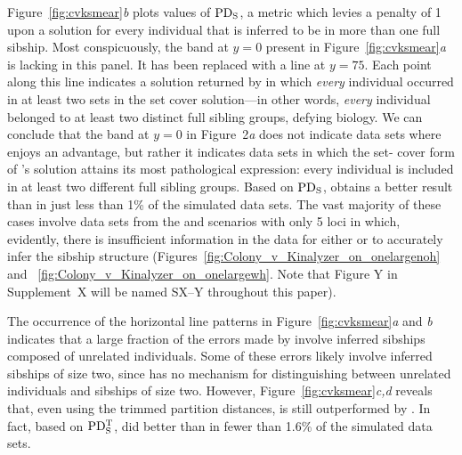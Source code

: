 \documentclass[11pt]{article}
\begin{document}
{Figure~\ref{fig:cvksmear}{\em b} plots values of $\mathrm{PD_S}$, a metric which levies a penalty of 1 upon a 
solution for every individual that is inferred to be in more than one full sibship.  Most 
conspicuously, the band at $y=0$ present in Figure~\ref{fig:cvksmear}{\em a} is lacking in this panel.  
It has been replaced with a line at $y=75$.  Each point along this line indicates a solution returned 
by \kinalyzer{} in which {\em every} individual occurred in at least two sets in the set cover 
solution---in other words, {\em every} individual belonged to at least two distinct full sibling 
groups, defying biology.  We can conclude that the band at $y=0$ in Figure~2{\em a} does not indicate 
data sets where \kinalyzer{} enjoys an advantage, but rather it indicates data sets in which the set-
cover form of \kinalyzer{}'s solution attains its most pathological expression: every individual is 
included in at least two different full sibling groups.  Based on $\mathrm{PD_S}$, \kinalyzer{} obtains a better 
result than \colony{} in just less than 1\% of the simulated data sets.  The vast majority of these 
cases involve data sets from the \onelargenoh{} and \onelargewh{} scenarios with only 5 loci in which, 
evidently, there is insufficient information in the data for either \colony{} or \kinalyzer{} to 
accurately infer the sibship structure (Figures~\ref{fig:Colony_v_Kinalyzer_on_onelargenoh} and~
\ref{fig:Colony_v_Kinalyzer_on_onelargewh}. Note that Figure Y in Supplement~X will be named SX--Y 
throughout this paper).  

The occurrence of the horizontal line patterns in Figure~\ref{fig:cvksmear}{\em a} and {\em b} 
indicates that a large fraction of the errors made by \kinalyzer{} involve inferred sibships composed 
of unrelated individuals.  Some of these errors likely involve inferred sibships of size two, since 
\kinalyzer{} has no mechanism for distinguishing between unrelated individuals and sibships of size 
two.   However, Figure~\ref{fig:cvksmear}{\em c,d} reveals that, even using the trimmed partition 
distances, \kinalyzer{} is still outperformed by \colony{}.   In fact, based on $\mathrm{PD_S^T}$, \kinalyzer{} 
did better than \colony{} in fewer than 1.6\% of the simulated data sets. 

}
\end{document}
